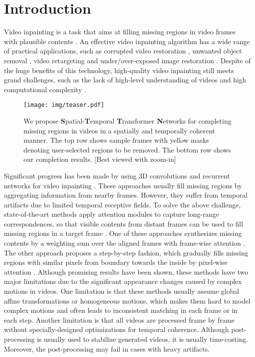 \documentclass[runningheads]{llncs}
\begin{document}
\section{Introduction}
\label{sec:intro}
Video inpainting is a task that aims at filling missing regions in video frames with plausible contents \cite{bertalmio2001navier}. An effective video inpainting algorithm has a wide range of practical applications, such as corrupted video restoration \cite{granados2012not}, unwanted object removal \cite{matsushita2006full,patwardhan2005video}, video retargeting \cite{kim2019deep} and under/over-exposed image restoration \cite{lee2019copy}. 
Despite of the huge benefits of this technology, high-quality video inpainting still meets grand challenges, such as the lack of high-level understanding of videos \cite{kim2019deepblind,wang2019video} and high computational complexity \cite{chang2019free,xu2019deep}. 

\begin{figure}
   \begin{center}
      \texttt{[image: img/teaser.pdf]}
   \end{center}
   \caption{We propose \textbf{S}patial-\textbf{T}emporal \textbf{T}ransformer \textbf{N}etworks for completing missing regions in videos in a spatially and temporally coherent manner. The top row shows sample frames with yellow masks denoting user-selected regions to be removed. The bottom row shows our completion results. [Best viewed with zoom-in]}
   \label{fig:teaser}
\end{figure}

Significant progress has been made by using 3D convolutions and recurrent networks for video inpainting \cite{chang2019free,kim2019deep,wang2019video}. These approaches usually fill missing regions by aggregating information from nearby frames. However, they suffer from temporal artifacts due to limited temporal receptive fields.
To solve the above challenge, state-of-the-art methods apply attention modules to capture long-range correspondences, so that visible contents from distant frames can be used to fill missing regions in a target frame \cite{lee2019copy,oh2019onion}. 
One of these approaches synthesizes missing contents by a weighting sum over the aligned frames with frame-wise attention \cite{lee2019copy}. The other approach proposes a step-by-step fashion, which gradually fills missing regions with similar pixels from boundary towards the inside by pixel-wise attention \cite{oh2019onion}. Although promising results have been shown, these methods have two major limitations due to the significant appearance changes caused by complex motions in videos.
One limitation is that these methods usually assume global affine transformations or homogeneous motions, 
which makes them hard to model complex motions and often leads to inconsistent matching in each frame or in each step. 
Another limitation is that all videos are processed frame by frame without specially-designed optimizations for temporal coherence. Although post-processing is usually used to stabilize generated videos, it is usually time-costing. Moreover, the post-processing may fail in cases with heavy artifacts. 
\end{document}
